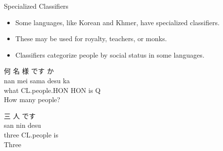 \documentclass{beamer}
\begin{document}
\begin{frame}{Specialized Classifiers}
\begin{itemize}
    \item Some languages, like Korean and Khmer, have specialized classifiers.
    \item These may be used for royalty, teachers, or monks.
    \item Classifiers categorize people by social status in some languages.
    \end{itemize}
\begin{exe}
\ex
\glll 何 名 様 です か \\
    nan mei sama desu ka \\
     what CL.people.HON HON is Q \\
\trans How many people? \\
\end{exe}
\begin{exe}
\ex
\glll 三 人 です \\
    san nin desu \\
    three CL.people is \\
\trans Three \\
\end{exe}
    
\end{frame}
\end{document}
